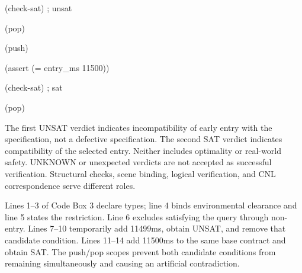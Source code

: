 \documentclass[nolineno]{ieeeaccess}
\begin{document}
{\begin{minipage}{\dimexpr\linewidth-2\fboxsep-2\fboxrule\relax}
\noindent{}\hspace{.4em}\parbox[t]{\dimexpr\linewidth-2em\relax}{\raggedright\ttfamily{}\fontsize{7.2}{9}\selectfont \hspace*{0.0em}(check-sat) ; unsat\strut}\par
\noindent{}\hspace{.4em}\parbox[t]{\dimexpr\linewidth-2em\relax}{\raggedright\ttfamily{}\fontsize{7.2}{9}\selectfont \hspace*{0.0em}(pop)\strut}\par
\noindent{}\hspace{.4em}\parbox[t]{\dimexpr\linewidth-2em\relax}{\raggedright\ttfamily{}\fontsize{7.2}{9}\selectfont \hspace*{0.0em}(push)\strut}\par
\noindent{}\hspace{.4em}\parbox[t]{\dimexpr\linewidth-2em\relax}{\raggedright\ttfamily{}\fontsize{7.2}{9}\selectfont \hspace*{0.0em}(assert (= entry\_\allowbreak ms 11500))\strut}\par
\noindent{}\hspace{.4em}\parbox[t]{\dimexpr\linewidth-2em\relax}{\raggedright\ttfamily{}\fontsize{7.2}{9}\selectfont \hspace*{0.0em}(check-sat) ; sat\strut}\par
\noindent{}\hspace{.4em}\parbox[t]{\dimexpr\linewidth-2em\relax}{\raggedright\ttfamily{}\fontsize{7.2}{9}\selectfont \hspace*{0.0em}(pop)\strut}\par
\end{minipage}}\par\smallskip

The first UNSAT verdict indicates incompatibility of early entry with the specification, not a defective specification. The second SAT verdict indicates compatibility of the selected entry. Neither includes optimality or real-world safety. UNKNOWN or unexpected verdicts are not accepted as successful verification. Structural checks, scene binding, logical verification, and CNL correspondence serve different roles.\par

Lines 1--3 of Code Box 3 declare types; line 4 binds environmental clearance and line 5 states the restriction. Line 6 excludes satisfying the query through non-entry. Lines 7--10 temporarily add 11499ms, obtain UNSAT, and remove that candidate condition. Lines 11--14 add 11500ms to the same base contract and obtain SAT. The push/pop scopes prevent both candidate conditions from remaining simultaneously and causing an artificial contradiction.\par
\end{document}
